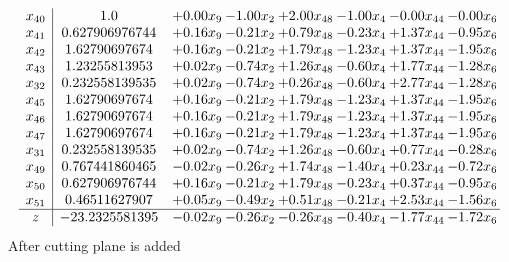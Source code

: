 \documentclass[8pt]{article}
\begin{document}
\[\begin{array}{c| c c@{\hskip 2pt} c@{\hskip 2pt} c@{\hskip 2pt} c@{\hskip 2pt} c@{\hskip 2pt} c@{\hskip 2pt} }
 x_{40}   &  1.0 & +  0.00 x_{9} & -1.00 x_{2} & +  2.00 x_{48} & -1.00 x_{4} & -0.00 x_{44} & -0.00 x_{6}\\
 x_{41}   &  0.627906976744 & +  0.16 x_{9} & -0.21 x_{2} & +  0.79 x_{48} & -0.23 x_{4} & +  1.37 x_{44} & -0.95 x_{6}\\
 x_{42}   &  1.62790697674 & +  0.16 x_{9} & -0.21 x_{2} & +  1.79 x_{48} & -1.23 x_{4} & +  1.37 x_{44} & -1.95 x_{6}\\
 x_{43}   &  1.23255813953 & +  0.02 x_{9} & -0.74 x_{2} & +  1.26 x_{48} & -0.60 x_{4} & +  1.77 x_{44} & -1.28 x_{6}\\
 x_{32}   &  0.232558139535 & +  0.02 x_{9} & -0.74 x_{2} & +  0.26 x_{48} & -0.60 x_{4} & +  2.77 x_{44} & -1.28 x_{6}\\
 x_{45}   &  1.62790697674 & +  0.16 x_{9} & -0.21 x_{2} & +  1.79 x_{48} & -1.23 x_{4} & +  1.37 x_{44} & -1.95 x_{6}\\
 x_{46}   &  1.62790697674 & +  0.16 x_{9} & -0.21 x_{2} & +  1.79 x_{48} & -1.23 x_{4} & +  1.37 x_{44} & -1.95 x_{6}\\
 x_{47}   &  1.62790697674 & +  0.16 x_{9} & -0.21 x_{2} & +  1.79 x_{48} & -1.23 x_{4} & +  1.37 x_{44} & -1.95 x_{6}\\
 x_{31}   &  0.232558139535 & +  0.02 x_{9} & -0.74 x_{2} & +  1.26 x_{48} & -0.60 x_{4} & +  0.77 x_{44} & -0.28 x_{6}\\
 x_{49}   &  0.767441860465 & -0.02 x_{9} & -0.26 x_{2} & +  1.74 x_{48} & -1.40 x_{4} & +  0.23 x_{44} & -0.72 x_{6}\\
 x_{50}   &  0.627906976744 & +  0.16 x_{9} & -0.21 x_{2} & +  1.79 x_{48} & -0.23 x_{4} & +  0.37 x_{44} & -0.95 x_{6}\\
 x_{51}   &  0.46511627907 & +  0.05 x_{9} & -0.49 x_{2} & +  0.51 x_{48} & -0.21 x_{4} & +  2.53 x_{44} & -1.56 x_{6}\\
\hline
z    &  -23.2325581395 & -0.02 x_{9} & -0.26 x_{2} & -0.26 x_{48} & -0.40 x_{4} & -1.77 x_{44} & -1.72 x_{6}\\
\end{array}\]
 After cutting plane is added 
\end{document}
